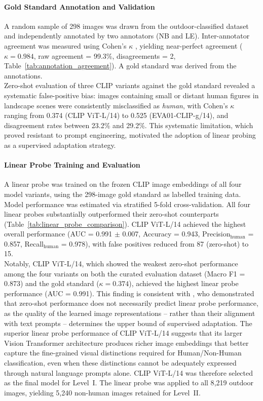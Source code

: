 \documentclass[hidelinks, 11pt]{article}
\begin{document}
\paragraph{Gold Standard Annotation and Validation}

A random sample of 298 images was drawn from the outdoor-classified dataset and independently annotated by two annotators (NB and LE). Inter-annotator agreement was measured using Cohen's $\kappa$ \citep{cohen1960coefficient}, yielding near-perfect agreement ($\kappa = 0.984$, raw agreement = 99.3\%, disagreements = 2, Table~\ref{tab:annotation_agreement}). A gold standard was 
derived from the annotations.
\\
Zero-shot evaluation of three CLIP variants against the gold standard revealed a systematic false-positive bias: images containing small or distant human figures in landscape scenes were consistently misclassified as \textit{human}, with Cohen's $\kappa$ ranging from 0.374 (CLIP ViT-L/14) to 0.525 (EVA01-CLIP-g/14), and disagreement rates between 23.2\% and 29.2\%. This systematic limitation, which proved resistant to prompt engineering, motivated 
the adoption of linear probing as a supervised adaptation strategy.

\paragraph{Linear Probe Training and Evaluation}

A linear probe was trained on the frozen CLIP image embeddings of all four model variants, using the 298-image gold standard as labelled training data. Model performance was estimated via stratified 5-fold cross-validation. All four linear probes substantially outperformed their zero-shot counterparts 
(Table~\ref{tab:linear_probe_comparison}). CLIP ViT-L/14 achieved the highest overall performance (AUC = 0.991 $\pm$ 0.007, Accuracy = 0.943, Precision$_\text{human}$ = 0.857, Recall$_\text{human}$ = 0.978), with false positives reduced from 87 (zero-shot) to 15.
\\
Notably, CLIP ViT-L/14, which showed the weakest zero-shot performance among the four variants on both the curated evaluation dataset (Macro F1 = 0.873) and the gold standard ($\kappa = 0.374$), achieved the highest linear probe performance (AUC = 0.991). This finding is consistent with \citet{radford2021learning}, who demonstrated that zero-shot performance does not necessarily predict linear probe performance, as the quality of the learned image representations -- rather than their alignment with text prompts -- determines the upper bound of supervised adaptation. The superior linear probe performance of CLIP ViT-L/14 suggests that its larger Vision Transformer 
architecture produces richer image embeddings that better capture the fine-grained visual distinctions required for Human/Non-Human classification, even when these distinctions cannot be adequately expressed through natural language prompts alone. CLIP ViT-L/14 was therefore selected as the final model for Level~I. The linear probe was applied to all 8{,}219 outdoor images, yielding 5{,}240 non-human images retained for Level~II.
\end{document}
